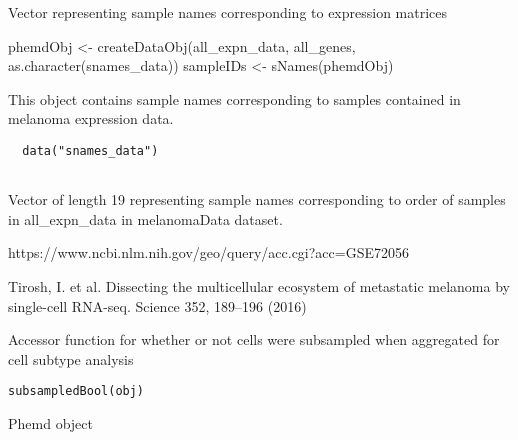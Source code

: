 \documentclass[a4paper]{book}
\begin{document}
%
\begin{Value}
Vector representing sample names corresponding to expression matrices
\end{Value}
%
\begin{Examples}
\begin{ExampleCode}
phemdObj <- createDataObj(all_expn_data, all_genes, as.character(snames_data))
sampleIDs <- sNames(phemdObj)

\end{ExampleCode}
\end{Examples}
%
\begin{Description}\relax
This object contains sample names corresponding to samples contained in melanoma expression data.
\end{Description}
%
\begin{Usage}
\begin{verbatim}
  data("snames_data")
  
\end{verbatim}
\end{Usage}
%
\begin{Format}
Vector of length 19 representing sample names corresponding to order of samples in all\_expn\_data in melanomaData dataset.
\end{Format}
%
\begin{Source}\relax
https://www.ncbi.nlm.nih.gov/geo/query/acc.cgi?acc=GSE72056
\end{Source}
%
\begin{References}\relax
Tirosh, I. et al. Dissecting the multicellular ecosystem of metastatic melanoma by single-cell RNA-seq. Science 352, 189–196 (2016)
\end{References}
%
\begin{Description}\relax
Accessor function for whether or not cells were subsampled when aggregated for cell subtype analysis
\end{Description}
%
\begin{Usage}
\begin{verbatim}
subsampledBool(obj)
\end{verbatim}
\end{Usage}
%
\begin{Arguments}
\begin{ldescription}
\item[\code{obj}] Phemd object
\end{ldescription}
\end{Arguments}
\end{document}
